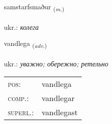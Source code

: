 \documentclass[frontgrid, backgrid]{flacards}\usepackage[]{graphicx}\usepackage[]{xcolor}
\begin{document}
\renewcommand{\flhead}{\vskip5pt \fboxsep=0pt {\small\bfseries\footnotesize Nafnorð | іменник}}
\renewcommand{\fcfoot}{\vskip5pt \fboxsep=0pt \hspace{2pt}{\small\bfseries\footnotesize 3K}}

\renewcommand{\blhead}{\vskip5pt {\small\bfseries\footnotesize Nafnorð | іменник }}
\renewcommand{\bcfoot}{\vskip5pt \hspace{2pt}{\small\bfseries\footnotesize 3K}}


{samstarfsmaður \small{\textsubscript{(\textit{m.})}} \\[1ex] %
\textphonetic{[samstarfsmaðʏr]} \\
ukr.: \emph{колега} \\  [2ex]
\renewcommand*{\arraystretch}{0.8}
}

\renewcommand{\flhead}{\vskip5pt \fboxsep=0pt {\small\bfseries\footnotesize Atviksorð | прислівник}}
\renewcommand{\fcfoot}{\vskip5pt \fboxsep=0pt \hspace{2pt}{\small\bfseries\footnotesize 3K}}

\renewcommand{\blhead}{\vskip5pt {\small\bfseries\footnotesize Atviksorð | прислівник }}
\renewcommand{\bcfoot}{\vskip5pt \hspace{2pt}{\small\bfseries\footnotesize 3K}}


{vandlega \small{\textsubscript{(\textit{adv.})}} \\[1ex] %
\textphonetic{[vantlɛɣa]} \\
ukr.: \emph{уважно; обережно; ретельно} \\  [2ex]
\renewcommand*{\arraystretch}{0.8}
\begin{tabular}{ll}
\textsc{pos}: & vandlega \\ 
\textsc{comp.}: & vandlegar \\ 
\textsc{superl.}: & vandlegast \\
\end{tabular}
}
\end{document}
